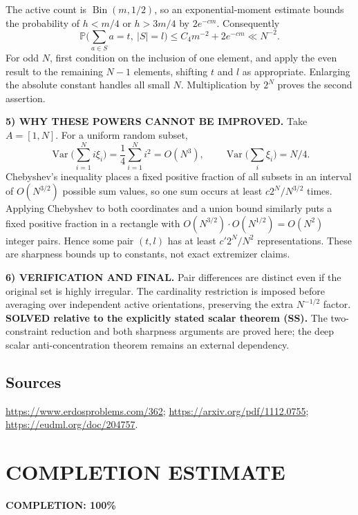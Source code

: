 The active count is $\operatorname{Bin}(m,1/2)$, so an exponential-moment estimate bounds the probability of $h<m/4$ or $h>3m/4$ by $2e^{-c m}$. Consequently
\[
 \mathbb P\big(\sum_{a\in S}a=t,\ |S|=l\big)
 \le C_4m^{-2}+2e^{-cm}\ll N^{-2}.
\]
For odd $N$, first condition on the inclusion of one element, and apply the even result to the remaining $N-1$ elements, shifting $t$ and $l$ as appropriate. Enlarging the absolute constant handles all small $N$. Multiplication by $2^N$ proves the second assertion.

\noindent\textbf{5) WHY THESE POWERS CANNOT BE IMPROVED.}
Take $A=[1,N]$. For a uniform random subset,
\[
 \operatorname{Var}\Big(\sum_{i=1}^Ni\xi_i\Big)
 =\frac14\sum_{i=1}^Ni^2=O(N^3),\qquad
 \operatorname{Var}\Big(\sum_i\xi_i\Big)=N/4.
\]
Chebyshev's inequality places a fixed positive fraction of all subsets in an interval of $O(N^{3/2})$ possible sum values, so one sum occurs at least $c2^N/N^{3/2}$ times. Applying Chebyshev to both coordinates and a union bound similarly puts a fixed positive fraction in a rectangle with $O(N^{3/2})\cdot O(N^{1/2})=O(N^2)$ integer pairs. Hence some pair $(t,l)$ has at least $c'2^N/N^2$ representations. These are sharpness bounds up to constants, not exact extremizer claims.

\noindent\textbf{6) VERIFICATION AND FINAL.}
Pair differences are distinct even if the original set is highly irregular. The cardinality restriction is imposed before averaging over independent active orientations, preserving the extra $N^{-1/2}$ factor. \textbf{SOLVED relative to the explicitly stated scalar theorem (SS).} The two-constraint reduction and both sharpness arguments are proved here; the deep scalar anti-concentration theorem remains an external dependency.

\subsection*{Sources}
\url{https://www.erdosproblems.com/362}; \url{https://arxiv.org/pdf/1112.0755}; \url{https://eudml.org/doc/204757}.

\section{COMPLETION ESTIMATE}
\textbf{COMPLETION: 100\%}
